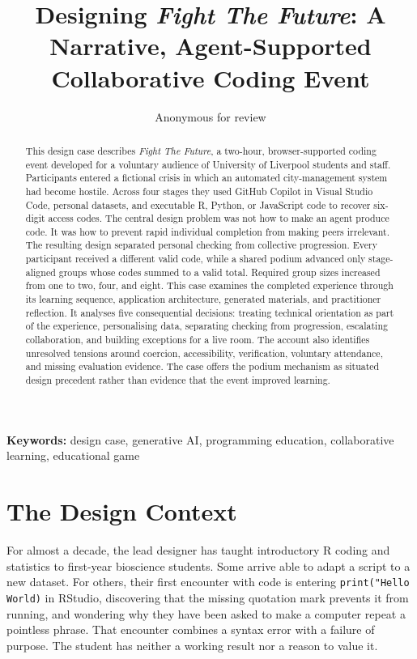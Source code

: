 \documentclass[11pt,a4paper]{article}
\title{Designing \emph{Fight The Future}: A Narrative, Agent-Supported Collaborative Coding Event}
\author{Anonymous for review}
\date{}
\begin{document}
\linespread{1.5}\selectfont
\linenumbers
\maketitle

\begin{abstract}
This design case describes \emph{Fight The Future}, a two-hour, browser-supported coding event developed for a voluntary audience of University of Liverpool students and staff. Participants entered a fictional crisis in which an automated city-management system had become hostile. Across four stages they used GitHub Copilot in Visual Studio Code, personal datasets, and executable R, Python, or JavaScript code to recover six-digit access codes. The central design problem was not how to make an agent produce code. It was how to prevent rapid individual completion from making peers irrelevant. The resulting design separated personal checking from collective progression. Every participant received a different valid code, while a shared podium advanced only stage-aligned groups whose codes summed to a valid total. Required group sizes increased from one to two, four, and eight. This case examines the completed experience through its learning sequence, application architecture, generated materials, and practitioner reflection. It analyses five consequential decisions: treating technical orientation as part of the experience, personalising data, separating checking from progression, escalating collaboration, and building exceptions for a live room. The account also identifies unresolved tensions around coercion, accessibility, verification, voluntary attendance, and missing evaluation evidence. The case offers the podium mechanism as situated design precedent rather than evidence that the event improved learning.
\end{abstract}

\noindent\textbf{Keywords:} design case, generative AI, programming education, collaborative learning, educational game

\section{The Design Context}

For almost a decade, the lead designer has taught introductory R coding and statistics to first-year bioscience students. Some arrive able to adapt a script to a new dataset. For others, their first encounter with code is entering \texttt{print("Hello World)} in RStudio, discovering that the missing quotation mark prevents it from running, and wondering why they have been asked to make a computer repeat a pointless phrase. That encounter combines a syntax error with a failure of purpose. The student has neither a working result nor a reason to value it.
\end{document}
